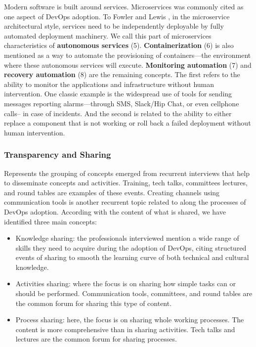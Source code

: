 Modern software is built around services. Microservices  was commonly cited
as one aspect of DevOps adoption. To Fowler and Lewis
\cite{martinfowler2014microservices}, in the
microservice architectural style, services need to be independently deployable
by fully automated deployment machinery. We call this part of microservices
characteristics of \textbf{autonomous services} (5). \textbf{Containerization}
(6) is also mentioned as a way to automate the provisioning of containers---the
environment where these autonomous services will execute.
\textbf{Monitoring automation} (7) and \textbf{recovery automation} (8) are the
remaining concepts. The first refers to the ability to monitor the
applications and infrastructure without human intervention. One classic example
is the widespread use of tools for sending messages reporting
alarms---through SMS, Slack/Hip Chat, or even
cellphone calls-- in case of incidents. And the second is related to the ability
to either replace a component that is not working or
roll back a failed deployment without human intervention.

\subsubsection{Transparency and Sharing} Represents the grouping of concepts
emerged from recurrent interviews that help to disseminate concepts and
activities. Training, tech talks, committees lectures, and round tables
are examples of these events. Creating
channels using communication tools is another recurrent topic
related to  along the processes of DevOps adoption.
According with the content of what is shared, we
have identified three main concepts:

\begin{itemize}
\item Knowledge sharing: the professionals interviewed mention a wide range of
skills they need to acquire during the adoption of DevOps, citing
structured events of sharing to smooth the learning curve of both technical and
cultural knowledge.


\item Activities sharing: where the focus is on sharing how simple tasks can or
should be performed. Communication tools, committees, and round tables are the common
forum for sharing this type of content.

\item Process sharing: here, the focus is on sharing whole working processes. The
content is more comprehensive than in sharing activities. Tech talks and
lectures are the common forum for sharing processes.

\end{itemize}

